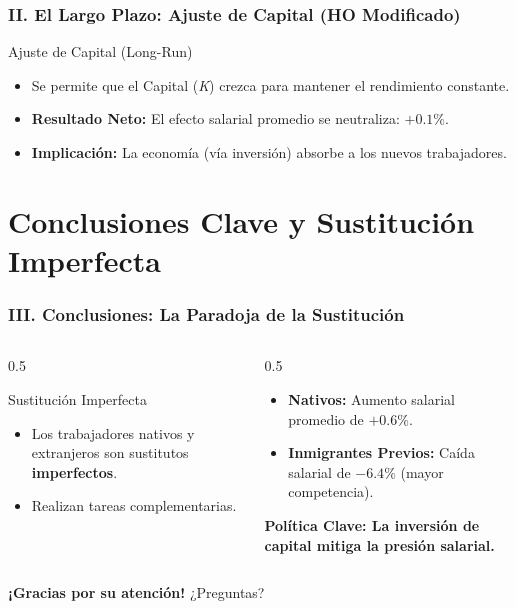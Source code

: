 \documentclass{beamer}
\begin{document}
\begin{frame}
\frametitle{II. El Largo Plazo: Ajuste de Capital (HO Modificado)}

\begin{block}{Ajuste de Capital (Long-Run)}
    \begin{itemize}
        \item Se permite que el Capital (\textit{K}) crezca para mantener el rendimiento constante.
        \item \textbf{Resultado Neto:} El efecto salarial promedio se neutraliza: \alert{\textbf{$+0.1\%$}}.
        \item \textbf{Implicación:} La economía (vía inversión) absorbe a los nuevos trabajadores.
    \end{itemize}
\end{block}

\end{frame}

\section{Conclusiones Clave y Sustitución Imperfecta}

\begin{frame}
\frametitle{III. Conclusiones: La Paradoja de la Sustitución}

\begin{columns}[T]
\begin{column}{0.5\textwidth}
\begin{block}{Sustitución Imperfecta}
    \begin{itemize}
        \item Los trabajadores nativos y extranjeros son sustitutos \textbf{imperfectos}.
        \item Realizan tareas complementarias.
    \end{itemize}
\end{block}
\end{column}

\begin{column}{0.5\textwidth}
\begin{itemize}
    \item \textbf{Nativos:} Aumento salarial promedio de \textbf{$+0.6\%$}.
    \item \textbf{Inmigrantes Previos:} Caída salarial de \alert{\textbf{$-6.4\%$}} (mayor competencia).
\end{itemize}
\vfill
\centering
\textbf{Política Clave: La inversión de capital mitiga la presión salarial.}
\end{column}
\end{columns}

\end{frame}

\begin{frame}
\centering
\Huge \textbf{¡Gracias por su atención!}
\vfill
\Large ¿Preguntas?
\end{frame}
\end{document}
